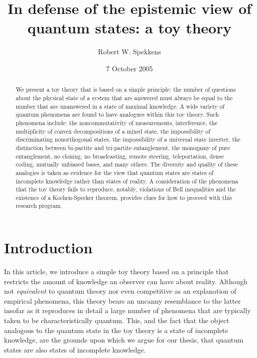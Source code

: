 \documentclass[pra,nofootinbib,showpacs,12pt]{revtex4}
\begin{document}
\author{Robert W. Spekkens}
\address{Perimeter Institute for Theoretical Physics,\\
31 Caroline St.~North, Waterloo, Canada N2L 2Y5}
\title{In defense of the epistemic view of quantum states: a toy theory}
\date{7 October 2005}

\begin{abstract}
We present a toy theory that is based on a simple principle: the
number of questions about the physical state of a system that are
answered must always be equal to the number that are unanswered in
a state of maximal knowledge. A wide variety of quantum phenomena
are found to have analogues within this toy theory. Such phenomena
include: the noncommutativity of measurements, interference, the
multiplicity of convex decompositions of a mixed state, the
impossibility of discriminating nonorthogonal states, the
impossibility of a universal state inverter, the distinction
between bi-partite and tri-partite entanglement, the monogamy of
pure entanglement, no cloning, no broadcasting, remote steering,
teleportation, dense coding, mutually unbiased bases, and many
others. The diversity and quality of these analogies is taken as
evidence for the view that quantum states are states of incomplete
knowledge rather than states of reality. A consideration of the
phenomena that the toy theory fails to reproduce, notably,
violations of Bell inequalities and the existence of a
Kochen-Specker theorem, provides clues for how to proceed with
this research program.
\end{abstract}

\maketitle
\tableofcontents

\section{Introduction}

\label{intro}

In this article, we introduce a simple toy theory based on a principle that
restricts the amount of knowledge an observer can have about reality.
Although not \emph{equivalent} to quantum theory nor even competitive as an
explanation of empirical phenomena, this theory bears an uncanny resemblance
to the latter insofar as it reproduces in detail a large number of phenomena
that are typically taken to be characteristically quantum. This, and the
fact that the object analogous to the quantum state in the toy theory is a
state of incomplete knowledge, are the grounds upon which we argue for our
thesis, that quantum states are also states of incomplete knowledge.
\end{document}
